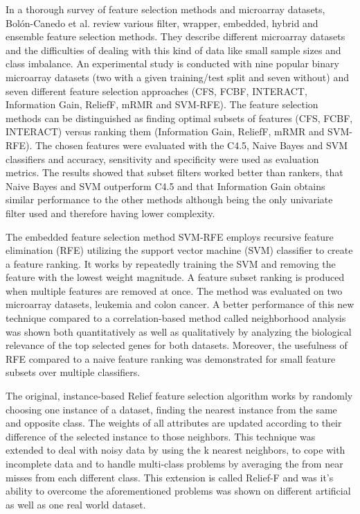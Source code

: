 In a thorough survey of feature selection methods and microarray datasets, Bolón-Canedo et al. review various filter, wrapper, embedded, hybrid and ensemble feature selection methods. They describe different microarray datasets and the difficulties of dealing with this kind of data like small sample sizes and class imbalance. An experimental study is conducted with nine popular binary microarray datasets (two with a given training/test split and seven without) and seven different feature selection approaches (CFS, FCBF, INTERACT, Information Gain, ReliefF, mRMR and SVM-RFE). The feature selection methods can be distinguished as finding optimal subsets of features (CFS, FCBF, INTERACT) versus ranking them (Information Gain, ReliefF, mRMR and SVM-RFE). The chosen features were evaluated with the C4.5, Naive Bayes and SVM classifiers and accuracy, sensitivity and specificity were used as evaluation metrics. The results showed that subset filters worked better than rankers, that Naive Bayes and SVM outperform C4.5 and that Information Gain obtains similar performance to the other methods although being the only univariate filter used and therefore having lower complexity. \cite{Bolon-Canedo2014}

The embedded feature selection method SVM-RFE employs recursive feature elimination (RFE) utilizing the support vector machine (SVM) classifier to create a feature ranking. It works by repeatedly training the SVM and removing the feature with the lowest weight magnitude. A feature subset ranking is produced when multiple features are removed at once. The method was evaluated on two microarray datasets, leukemia and colon cancer. A better performance of this new technique compared to a correlation-based method called neighborhood analysis was shown both quantitatively as well as qualitatively by analyzing the biological relevance of the top selected genes for both datasets. Moreover, the usefulness of RFE compared to a naive feature ranking was demonstrated for small feature subsets over multiple classifiers. \cite{guyon2002gene}

The original, instance-based Relief feature selection algorithm works by randomly choosing one instance of a dataset, finding the nearest instance from the same and opposite class. The weights of all attributes are updated according to their difference of the selected instance to those neighbors. \cite{kira1992practical} This technique was extended to deal with noisy data by using the k nearest neighbors, to cope with incomplete data and to handle multi-class problems by averaging the  from near misses from each different class. This extension is called Relief-F and was it's ability to overcome the aforementioned problems was shown on different artificial as well as one real world dataset. \cite{kononenko1994estimating}

